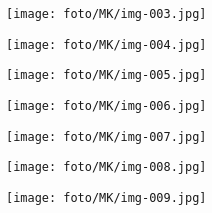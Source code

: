 \begin{figure}
    \centering
    \texttt{[image: foto/МК/img-003.jpg]}
\end{figure}

\begin{figure}
    \centering
    \texttt{[image: foto/МК/img-004.jpg]}
\end{figure}

\begin{figure}
    \centering
    \texttt{[image: foto/МК/img-005.jpg]}
\end{figure}

\begin{figure}
    \centering
    \texttt{[image: foto/МК/img-006.jpg]}
\end{figure}

\begin{figure}
    \centering
    \texttt{[image: foto/МК/img-007.jpg]}
\end{figure}

\begin{figure}
    \centering
    \texttt{[image: foto/МК/img-008.jpg]}
\end{figure}

\begin{figure}
    \centering
    \texttt{[image: foto/МК/img-009.jpg]}
\end{figure}
